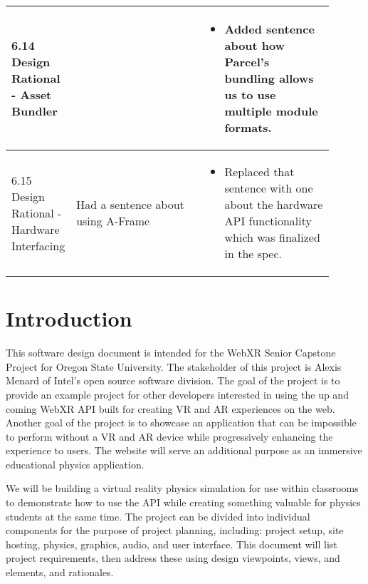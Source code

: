 \documentclass[onecolumn, draftclsnofoot,10pt, compsoc]{IEEEtran}
\begin{document}
\begin{longtable}{ |p{0.1\linewidth}|p{0.4\linewidth}|p{0.4\linewidth}| }
 6.14 Design Rational - Asset Bundler
 &
 
 &
 \begin{itemize}
     \item Added sentence about how Parcel's bundling allows us to use multiple module formats.
 \end{itemize} \\
 \hline
 
 6.15 Design Rational - Hardware Interfacing
 &
 Had a sentence about using A-Frame
 &
 \begin{itemize}
     \item Replaced that sentence with one about the hardware API functionality which was finalized in the spec.
 \end{itemize} \\
 \hline
 

\end{longtable}

\section{Introduction}
This software design document is intended for the WebXR Senior Capstone Project for Oregon State University. The stakeholder of this project is Alexis Menard of Intel's open source software division. The goal of the project is to provide an example project for other developers interested in using the up and coming WebXR API built for creating VR and AR experiences on the web. Another goal of the project is to showcase an application that can be impossible to perform without a VR and AR device while progressively enhancing the experience to users. The website will serve an additional purpose as an immersive educational physics application.

We will be building a virtual reality physics simulation for use within classrooms to demonstrate how to use the API while creating something valuable for physics students at the same time. The project can be divided into individual components for the purpose of project planning, including: project setup, site hosting, physics, graphics, audio, and user interface. This document will list project requirements, then address these using design viewpoints, views, and elements, and rationales. 
\end{document}
